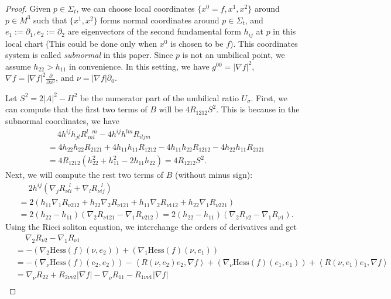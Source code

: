 \documentclass[12pt,a4paper]{amsart}
\begin{document}
\begin{proof}
Given $p\in\Sigma_t$,
we can choose local coordinates $\{x^0=f,x^1,x^2\}$ around $p\in M^3$ such that
$\{x^1,x^2\}$ forms normal coordinates around $p\in \Sigma_t$, and $e_1:=\partial_1 ,e_2:=\partial_2$
are eigenvectors of the second fundamental form $h_{ij}$ at $p$ in this local chart (This could be done only when $x^0$ is chosen to be $f$).
This coordinates system is called {\it subnormal} in this paper.
Since $p$ is not an umbilical point, we assume $h_{22}>h_{11}$ in convenience.
In this setting, we have $g^{00}=|\nabla f|^2$, $\nabla f=|\nabla f|^2\frac{\partial}{\partial x^0}$, and $\nu=|\nabla f|\partial_0$.

Let $S^2=2|A|^2-H^2$ be the numerator part of the umbilical ratio $U_\sigma$.
First, we can compute that the first two terms of $B$ will be $4R_{1212}S^2$.
This is because in the subnormal coordinates, we have
\begin{align*}
&\quad\ 4h^{ij}h_{jl}R_{\ mi\ }^{l\ \ \ m}-4 h^{ij}h^{lm}R_{iljm} \\
&=4h_{22}h_{22}R_{2121}+4h_{11}h_{11}R_{1212}
-4h_{11}h_{22}R_{1212}-4h_{22}h_{11}R_{2121} \\
&=4R_{1212}(h_{22}^2+h_{11}^2-2h_{11}h_{22})=4R_{1212}S^2.
\end{align*}
Next, we will compute the rest two terms of $B$ (without minus sign):
\begin{align*}
&\quad\ 2h^{ij}\left(\nabla_j R_{\nu li}^{\ \ \ l}+\nabla_l R_{\nu ij}^{\ \ \ l}\right)\\
&=2\left(h_{11}\nabla_1R_{\nu 212}+h_{22}\nabla_2R_{\nu 121}+h_{11}\nabla_2R_{\nu 112}+h_{22}\nabla_1R_{\nu 221}\right)\\
&=2\left(h_{22}-h_{11}\right)\left(\nabla_2R_{\nu 121}-\nabla_1R_{\nu 212} \right)
=2\left(h_{22}-h_{11}\right)(\nabla_2R_{\nu 2}-\nabla_1R_{\nu 1}).
\end{align*}
Using the Ricci soliton equation, we interchange the orders of derivatives and get
\begin{align*}
&\quad\ \nabla_2R_{\nu 2}-\nabla_1R_{\nu 1} \\
&=-(\nabla_{2}\mathrm{Hess}(f)(\nu,e_2))+(\nabla_{1}\mathrm{Hess}(f)(\nu, e_1)) \\
&=-(\nabla_\nu\mathrm{Hess}(f)(e_2,e_2))-\left\langle R(\nu,e_2)e_2,\nabla f\right\rangle
+(\nabla_\nu\mathrm{Hess}(f)(e_1, e_1))+\left\langle R(\nu,e_1)e_1,\nabla f\right\rangle \\
&=\nabla_\nu R_{22}+R_{2\nu \nu 2}|\nabla f|-\nabla_\nu R_{11}-R_{1\nu \nu 1}|\nabla f| \\

\end{align*}
\end{proof}
\end{document}
